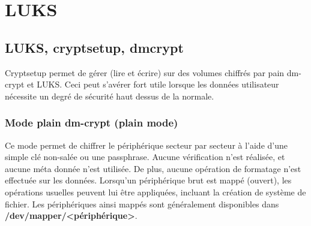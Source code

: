 
\chapter{LUKS} %

\label{Chapitre 6.1} %




\section{LUKS, cryptsetup, dmcrypt}
Cryptsetup permet de gérer (lire et écrire) sur des volumes chiffrés par pain dm-crypt et LUKS. Ceci peut s'avérer fort utile lorsque les données utilisateur nécessite un degré de sécurité haut dessus de la normale.
\subsection{Mode plain dm-crypt (plain mode)}
Ce mode permet de chiffrer le périphérique secteur par secteur à l'aide d'une simple clé non-salée ou une passphrase. Aucune vérification n'est réalisée, et aucune méta donnée n'est utilisée. De plus, aucune opération de formatage n'est effectuée sur les données. Lorsqu'un périphérique brut est mappé (ouvert), les opérations usuelles peuvent lui être appliquées, incluant la création de système de fichier. Les périphériques ainsi mappés sont généralement disponibles dans \textbf{/dev/mapper/<périphérique>}.
